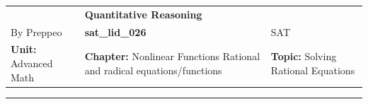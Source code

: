 \documentclass[11pt,paper=a4,answers]{exam}
\begin{document}
\begin{center}
    \centering
    \renewcommand{\arraystretch}{1.5}
    \begin{tabularx}{\textwidth}{YYY}
    & \normalsize\bf{{\Large{{Quantitative Reasoning}}}} & \\
    By Preppeo & \normalsize\bf{{sat\_lid\_026}} & SAT\\
    \normalsize{{\textbf{{Unit:}} Advanced Math}} & \normalsize{{\textbf{{Chapter:}} Nonlinear Functions	Rational and radical equations/functions}} & \normalsize{{\textbf{{Topic:}} Solving Rational Equations}} \\
    \end{tabularx}
\end{center}
\par\noindent\rule{\textwidth}{1pt}
\end{document}
